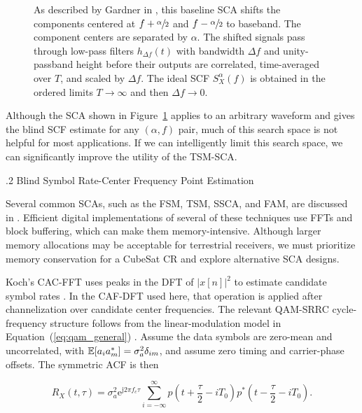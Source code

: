 \begin{figure}[H]
\begin{center}
\resizebox{0.94\textwidth}{!}{}
\caption[Example of a baseline SCA.]{As described by Gardner in \cite{gardner-06}, this baseline SCA shifts the components centered at $f+\sfrac{\alpha}{2}$ and $f-\sfrac{\alpha}{2}$ to baseband.  The component centers are separated by $\alpha$.  The shifted signals pass through low-pass filters $h_{\Delta f}(t)$ with bandwidth $\Delta f$ and unity-passband height before their outputs are correlated, time-averaged over $T$, and scaled by $\Delta f$.  The ideal SCF $S_{X}^{\alpha}(f)$ is obtained in the ordered limits $T\rightarrow\infty$ and then $\Delta f\rightarrow0$.}
\label{fig:gardner_sca}
\end{center}
\end{figure}

Although the SCA shown in Figure~\ref{fig:gardner_sca} applies to an arbitrary waveform and gives the blind SCF estimate for any $(\alpha,f)$ pair, much of this search space is not helpful for most applications.  If we can intelligently limit this search space, we can significantly improve the utility of the TSM-SCA.

%
%
\bigskip
{}
.2 \quad Blind Symbol Rate-Center Frequency Point Estimation

Several common SCAs, such as the FSM, TSM, SSCA, and FAM, are discussed in \cite{spooner-92}.  Efficient digital implementations of several of these techniques use FFTs and block buffering, which can make them memory-intensive.  Although larger memory allocations may be acceptable for terrestrial receivers, we must prioritize memory conservation for a CubeSat CR and explore alternative SCA designs.

Koch's CAC-FFT uses peaks in the DFT of $|x[n]|^2$ to estimate candidate symbol rates \cite{koch-19}.  In the CAF-DFT used here, that operation is applied after channelization over candidate center frequencies.  The relevant QAM-SRRC cycle-frequency structure follows from the linear-modulation model in Equation~(\ref{eq:qam_general}) \cite{gardner-90}.  Assume the data symbols are zero-mean and uncorrelated, with $\operatorname{\mathbb{E}}[a_i a_m^*]=\sigma_a^2\delta_{im}$, and assume zero timing and carrier-phase offsets.  The symmetric ACF is then

\begin{equation}\label{eq:lms_acf}
R_{X}(t,\tau)=\sigma_a^{2}\mathrm{e}^{\mathrm{j}2\pi f_c\tau}\sum_{i=-\infty}^{\infty}
p\left(t+\frac{\tau}{2}-iT_{0}\right)
p^{*}\left(t-\frac{\tau}{2}-iT_{0}\right).
\end{equation}

